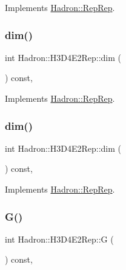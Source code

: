 Implements \mbox{\hyperlink{structHadron_1_1RepRep_a92c8802e5ed7afd7da43ccfd5b7cd92b}{Hadron\+::\+Rep\+Rep}}.

\mbox{\label{structHadron_1_1H3D4E2Rep_ae4a78fda385ad21cf43f989f5b3aec5f}} 
\subsubsection{\texorpdfstring{dim()}{dim()}\hspace{0.1cm}{\footnotesize\ttfamily [2/3]}}
{\footnotesize\ttfamily int Hadron\+::\+H3\+D4\+E2\+Rep\+::dim (\begin{DoxyParamCaption}{ }\end{DoxyParamCaption}) const\hspace{0.3cm}{\ttfamily [inline]}, {\ttfamily [virtual]}}



Implements \mbox{\hyperlink{structHadron_1_1RepRep_a92c8802e5ed7afd7da43ccfd5b7cd92b}{Hadron\+::\+Rep\+Rep}}.

\mbox{\label{structHadron_1_1H3D4E2Rep_ae4a78fda385ad21cf43f989f5b3aec5f}} 
\subsubsection{\texorpdfstring{dim()}{dim()}\hspace{0.1cm}{\footnotesize\ttfamily [3/3]}}
{\footnotesize\ttfamily int Hadron\+::\+H3\+D4\+E2\+Rep\+::dim (\begin{DoxyParamCaption}{ }\end{DoxyParamCaption}) const\hspace{0.3cm}{\ttfamily [inline]}, {\ttfamily [virtual]}}



Implements \mbox{\hyperlink{structHadron_1_1RepRep_a92c8802e5ed7afd7da43ccfd5b7cd92b}{Hadron\+::\+Rep\+Rep}}.

\mbox{\label{structHadron_1_1H3D4E2Rep_a90b501cdfc244c792b2fac27a1470b78}} 
\subsubsection{\texorpdfstring{G()}{G()}\hspace{0.1cm}{\footnotesize\ttfamily [1/2]}}
{\footnotesize\ttfamily int Hadron\+::\+H3\+D4\+E2\+Rep\+::G (\begin{DoxyParamCaption}{ }\end{DoxyParamCaption}) const\hspace{0.3cm}{\ttfamily [inline]}, {\ttfamily [virtual]}}

